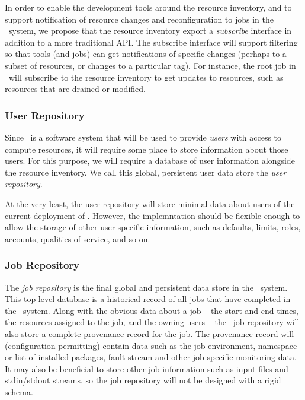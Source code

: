 In order to enable the development tools around the resource
inventory, and to support notification of resource changes and
reconfiguration to jobs in the \ngrm\ system, we propose that
the resource inventory export a \emph{subscribe} interface in
addition to a more traditional API. The subscribe interface will
support filtering so that tools (and jobs) can get notifications
of specific changes (perhaps to a subset of resources, or changes
to a particular tag). For instance, the root job in \ngrm\ will
subscribe to the resource inventory to get updates to resources,
such as resources that are drained or modified.

\subsubsection{User Repository}

Since \ngrm\ is a software system that will be used to provide
\emph{users} with access to compute resources, it will require
some place to store information about those users. For this
purpose, we will require a database of user information alongside
the resource inventory. We call this global, persistent user
data store the \emph{user repository}.

At the very least, the user repository will store minimal
data about users of the current deployment of \ngrm. However,
the implemntation should be flexible enough to allow the storage
of other user-specific information, such as defaults, limits,
roles, accounts, qualities of service, and so on.

\subsubsection{Job Repository}

The \emph{job repository} is the final global and persistent
data store in the \ngrm\ system. This top-level database is a
historical record of all jobs that have completed in the
\ngrm\ system. Along with the obvious data about a job --
the start and end times, the resources assigned to the job,
and the owning users -- the \ngrm\ job repository will also
store a complete provenance record for the job. The provenance
record will (configuration permitting) contain data such as the
job environment, namespace or list of installed packages, fault
stream and other job-specific monitoring data. It may also be
beneficial to store other job information such as input files
and stdin/stdout streams, so the job repository will not be
designed with a rigid schema.

